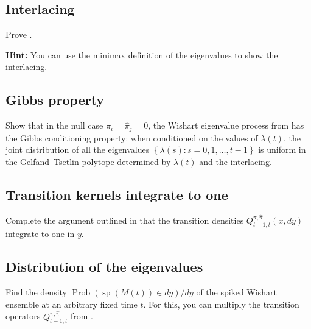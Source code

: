 \documentclass[letterpaper,11pt,oneside,reqno]{article}
\numberwithin{equation}{section}
\theoremstyle{definition}
\begin{document}
\subsection{Interlacing}
\label{prob:interlacing}

Prove .

\medskip
\noindent
\textbf{Hint:} You can use the minimax definition of the eigenvalues to show the interlacing.

\subsection{Gibbs property}
\label{prob:Gibbs}

Show that in the null case \(\pi_i = \hat\pi_j = 0\), the
Wishart eigenvalue process
from 
has the Gibbs conditioning property:
when conditioned on the values of
$\lambda(t)$, the joint distribution of
all the eigenvalues
$\left\{ \lambda(s)\colon s=0,1,\ldots,t-1  \right\}$
is uniform in the Gelfand--Tsetlin polytope
determined by $\lambda(t)$ and the interlacing.


\subsection{Transition kernels integrate to one}
\label{prob:CauchyBinet}

Complete the argument outlined in 
that the transition densities $Q^{\pi,\hat\pi}_{t-1,t}(x,dy)$
integrate to one in $y$.


\subsection{Distribution of the eigenvalues}
\label{prob:Wishart_non_null}

Find the density
$\operatorname{Prob}\left( \operatorname{sp}(M(t))\in dy \right)/dy$
of the spiked Wishart ensemble
at an arbitrary fixed time $t$.
For this, you can multiply the transition operators
$Q^{\pi,\hat\pi}_{t-1,t}$ from .





\end{document}
